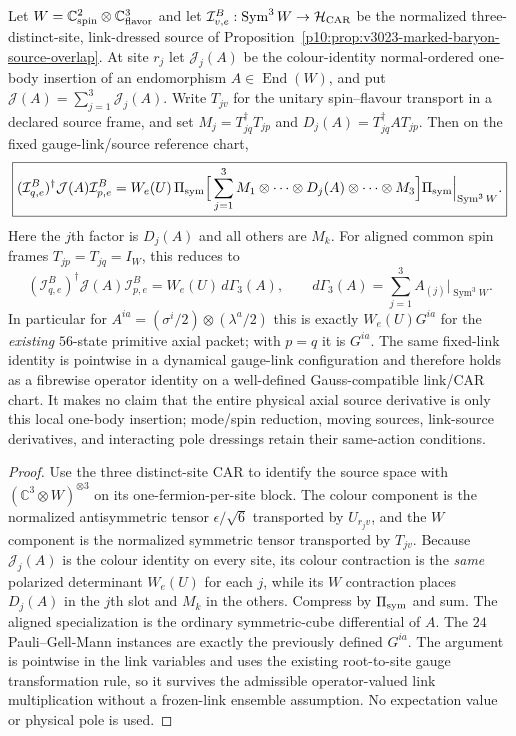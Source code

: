 \documentclass[12pt,a4paper]{article}
\begin{document}
\begin{theorem}
\label{p10:thm:v375-rooted-CAR-axial-insertion}
Let $W=\mathbb C^2_{\rm spin}\otimes\mathbb C^3_{\rm flavor}$ and let
$\mathcal I_{v,e}^{B}:\operatorname{Sym}^3W\to\mathcal H_{\rm CAR}$
be the normalized three-distinct-site, link-dressed source of
Proposition~\ref{p10:prop:v3023-marked-baryon-source-overlap}.
At site $r_j$ let $\mathcal J_j(A)$ be the colour-identity
normal-ordered one-body insertion of an endomorphism $A\in\operatorname{End}(W)$,
and put $\mathcal J(A)=\sum_{j=1}^3\mathcal J_j(A)$.
Write $T_{jv}$ for the unitary spin--flavour transport in a declared
source frame, and set
$M_{j}=T_{jq}^{\dagger}T_{jp}$ and
$D_j(A)=T_{jq}^{\dagger}AT_{jp}$.
Then on the fixed gauge-link/source reference chart,
\[
\boxed{
 (\mathcal I_{q,e}^{B})^\dagger\mathcal J(A)\mathcal I_{p,e}^{B}
 =W_e(U)\,\Pi_{\rm sym}
   \Big[\sum_{j=1}^{3}
   M_1\otimes\cdots\otimes D_j(A)\otimes\cdots\otimes M_3
   \Big]\Pi_{\rm sym}\Big|_{\operatorname{Sym}^3W}.}
\]
Here the $j$th factor is $D_j(A)$ and all others are $M_k$.
For aligned common spin frames $T_{jp}=T_{jq}=I_W$, this reduces to
\[
\boxed{(\mathcal I_{q,e}^{B})^\dagger\mathcal J(A)\mathcal I_{p,e}^{B}
 =W_e(U)\,d\Gamma_3(A),\qquad
 d\Gamma_3(A)=\sum_{j=1}^3 A_{(j)}\big|_{\operatorname{Sym}^3W}.}
\]
In particular for $A^{ia}=(\sigma^i/2)\otimes(\lambda^a/2)$
this is exactly $W_e(U)G^{ia}$ for the \emph{existing}
$56$-state primitive axial packet; with $p=q$ it is $G^{ia}$.
The same fixed-link identity is pointwise in a dynamical gauge-link
configuration and therefore holds as a fibrewise operator identity
on a well-defined Gauss-compatible link/CAR chart.
It makes no claim that the entire physical axial source derivative is
only this local one-body insertion; mode/spin reduction, moving sources,
link-source derivatives, and interacting pole dressings retain their
same-action conditions.
\end{theorem}
\begin{proof}
Use the three distinct-site CAR to identify the source space with
$(\mathbb C^3\otimes W)^{\otimes3}$ on its one-fermion-per-site block.
The colour component is the normalized antisymmetric tensor
$\epsilon/\sqrt6$ transported by $U_{r_jv}$, and the $W$ component
is the normalized symmetric tensor transported by $T_{jv}$.
Because $\mathcal J_j(A)$ is the colour identity on every site,
its colour contraction is the \emph{same} polarized determinant
$W_e(U)$ for each $j$, while its $W$ contraction places $D_j(A)$
in the $j$th slot and $M_k$ in the others. Compress by
$\Pi_{\rm sym}$ and sum. The aligned specialization is the
ordinary symmetric-cube differential of $A$. The $24$ Pauli--Gell-Mann
instances are exactly the previously defined $G^{ia}$.
The argument is pointwise in the link variables and uses the existing
root-to-site gauge transformation rule, so it survives the admissible
operator-valued link multiplication without a frozen-link ensemble
assumption. No expectation value or physical pole is used.
\end{proof}
\end{document}
